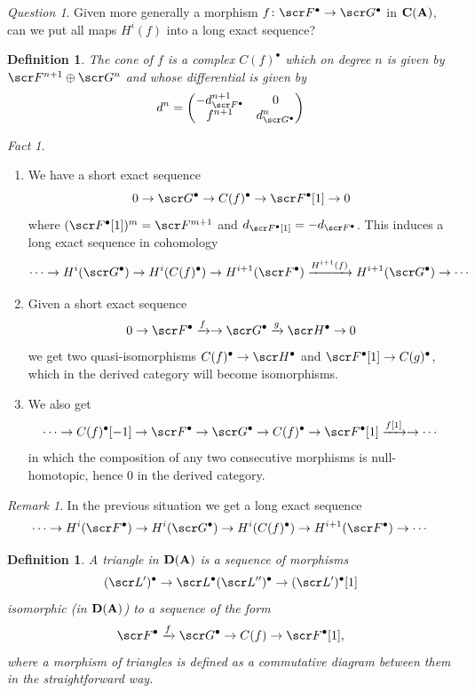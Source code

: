 \documentclass[A4paper, british, reqno]{amsart}
\theoremstyle{darkgreentheorem}
\theoremstyle{darkbluedefinition}
\newtheorem{defn}[thm]{Definition}
\theoremstyle{darkredexample}
\theoremstyle{remark}
\newtheorem{rem}[thm]{Remark}
\newtheorem{fact}[thm]{Fact}
\newtheorem{q}[thm]{Question}
\newcommand{\1}{\mathbbm{1}}
\newcommand{\op}{\oplus}
\newcommand{\grd}{^{\bullet}}
\begin{document}
\begin{q}
    Given more generally a morphism $f\colon \F\grd\to \G\grd$ in $\mathbf{C}(\mathbf{A})$, can we put all maps $H^{i}(f)$ into a long exact sequence?
\end{q}

\begin{defn}
    The \textit{cone of $f$} is a complex $C(f)\grd$ which on degree $n$ is given by $\F^{n+1}\op \G^{n}$ and whose differential is given by
    \[ d^{n}=\begin{pmatrix} -d_{\F\grd}^{n+1} & 0 \\ f^{n+1} & d_{\G\grd}^{n} \end{pmatrix} \]
\end{defn}

\begin{fact}
    \begin{enumerate}
	\item We have a short exact sequence
	    \[ 0\to \G\grd\to C(f)\grd \to \F\grd[1] \to 0 \]
	    where $(\F\grd[1])^{m}=\F^{m+1}$ and $d_{\F\grd[1]}=-d_{\F\grd}$.
	    This induces a long exact sequence in cohomology
	    \[ \cdots \to H^{i}(\G\grd)\to H^{i}(C(f)\grd)\to H^{i+1}(\F\grd)\xrightarrow{H^{i+1}(f)} H^{i+1}(\G\grd)\to \cdots \]
	\item Given a short exact sequence
	    \[ 0\to \F\grd\xrightarrow{f}\to \G\grd\xrightarrow{g} \sH\grd \to 0 \]
	    we get two quasi-isomorphisms $C(f)\grd\to \sH\grd$ and $\F\grd[1]\to C(g)\grd$, which in the derived category will become isomorphisms.
	\item We also get
	    \[ \cdots \to C(f)\grd[-1]\to \F\grd\to \G\grd \to C(f)\grd\to \F\grd[1]\xrightarrow{f[1]}\to \cdots \]
	    in which the composition of any two consecutive morphisms is null-homotopic, hence $0$ in the derived category.
    \end{enumerate}
\end{fact}

\begin{rem}
    In the previous situation we get a long exact sequence
    \[ \cdots \to H^{i}(\F\grd)\to H^{i}(\G\grd)\to H^{i}(C(f)\grd)\to H^{i+1}(\F\grd)\to \cdots \]
\end{rem}

\begin{defn}
    A \textit{triangle} in $\mathbf{D}(\mathbf{A})$ is a sequence of morphisms
    \[ (\L')\grd\to \L\grd (\L'')\grd\to (\L')\grd[1] \]
    isomorphic (in $\mathbf{D}(\mathbf{A})$) to a sequence of the form
    \[ \F\grd\xrightarrow{f} \G\grd\to C(f)\to \F\grd[1], \]
    where a morphism of triangles is defined as a commutative diagram between them in the straightforward way.
\end{defn}
\end{document}
